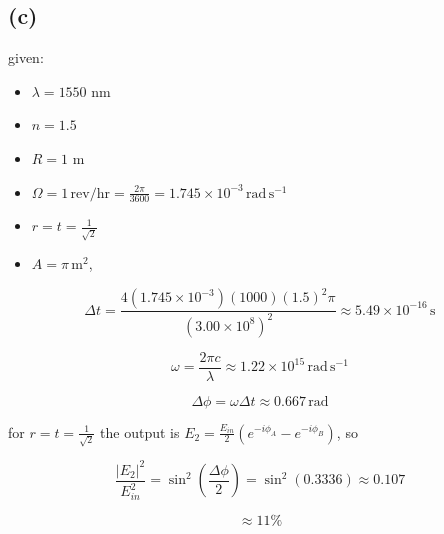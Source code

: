\documentclass{article}
\begin{document}
\subsection*{(c)}

given:

\begin{itemize}
    \item $\lambda = 1550 \text{ nm}$
    \item $n=1.5$
    \item $R=1\text{ m}$
    \item $\Omega=1\,\mathrm{rev/hr}=\frac{2\pi}{3600}=1.745\times10^{-3}\,\mathrm{rad\,s^{-1}}$
    \item $r=t=\frac{1}{\sqrt{2}}$
    \item $A=\pi\,\mathrm{m^2}$,
\end{itemize}
 
\[
\Delta t=\frac{4(1.745\times10^{-3})(1000)(1.5)^2\pi}{(3.00\times10^8)^2}
\approx5.49\times10^{-16}\,\mathrm{s}
\]
 
\[
\omega=\frac{2\pi c}{\lambda}\approx1.22\times10^{15}\,\mathrm{rad\,s^{-1}}
\]
 
\[
\Delta\phi=\omega\Delta t\approx0.667\,\mathrm{rad}
\]
 
for $r=t=\frac{1}{\sqrt2}$ the output is $E_2=\frac{E_{in}}{2}\left(e^{-i\phi_A}-e^{-i\phi_B}\right)$, so
 
\[
\frac{|E_2|^2}{E_{in}^2}=\sin^2\left(\frac{\Delta\phi}{2}\right)
=\sin^2(0.3336)\approx0.107
\]
 
\[
\boxed{\approx11\%}
\]
\end{document}

